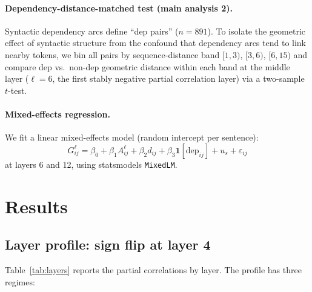 \documentclass[11pt,a4paper]{article}
\begin{document}
\paragraph{Dependency-distance-matched test (main analysis 2).}
Syntactic dependency arcs define ``dep pairs'' ($n=891$).
To isolate the geometric effect of syntactic structure from the
confound that dependency arcs tend to link nearby tokens, we bin all
pairs by sequence-distance band $[1,3)$, $[3,6)$, $[6,15)$ and
compare dep vs.\ non-dep geometric distance within each band
at the middle layer ($\ell = 6$, the first stably negative partial correlation layer)
via a two-sample $t$-test.

\paragraph{Mixed-effects regression.}
We fit a linear mixed-effects model (random intercept per sentence):
\begin{equation}
  G_{ij}^\ell = \beta_0 + \beta_1 A_{ij}^\ell + \beta_2 d_{ij}
              + \beta_3 \mathbf{1}[\mathrm{dep}_{ij}] + u_s + \varepsilon_{ij}
\end{equation}
at layers 6 and 12, using statsmodels \texttt{MixedLM}.

\section{Results}

\subsection{Layer profile: sign flip at layer 4}

Table~\ref{tab:layers} reports the partial correlations by layer.
The profile has three regimes:
\end{document}

